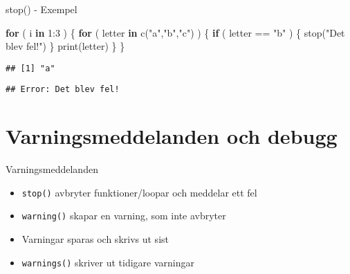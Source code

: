 \documentclass[
  11pt,
  ignorenonframetext,
]{beamer}
\newenvironment{Shaded}{\begin{snugshade}}{\end{snugshade}}
\newcommand{\ControlFlowTok}[1]{\textcolor[rgb]{0.13,0.29,0.53}{\textbf{#1}}}
\newcommand{\DecValTok}[1]{\textcolor[rgb]{0.00,0.00,0.81}{#1}}
\newcommand{\FunctionTok}[1]{\textcolor[rgb]{0.00,0.00,0.00}{#1}}
\newcommand{\NormalTok}[1]{#1}
\newcommand{\SpecialCharTok}[1]{\textcolor[rgb]{0.00,0.00,0.00}{#1}}
\newcommand{\StringTok}[1]{\textcolor[rgb]{0.31,0.60,0.02}{#1}}
\providecommand{\tightlist}{%
  \setlength{\itemsep}{0pt}\setlength{\parskip}{0pt}}
\begin{document}
\begin{frame}[fragile]{stop() - Exempel}
\protect\hypertarget{stop---exempel}{}
\begin{Shaded}
\begin{Highlighting}[]
\ControlFlowTok{for}\NormalTok{ ( i }\ControlFlowTok{in} \DecValTok{1}\SpecialCharTok{:}\DecValTok{3}\NormalTok{ ) \{}
  \ControlFlowTok{for}\NormalTok{ ( letter }\ControlFlowTok{in} \FunctionTok{c}\NormalTok{(}\StringTok{"a"}\NormalTok{,}\StringTok{"b"}\NormalTok{,}\StringTok{"c"}\NormalTok{) ) \{}
    \ControlFlowTok{if}\NormalTok{ ( letter }\SpecialCharTok{==} \StringTok{"b"}\NormalTok{ ) \{ }\FunctionTok{stop}\NormalTok{(}\StringTok{"Det blev fel!"}\NormalTok{) \}}
    \FunctionTok{print}\NormalTok{(letter)}
\NormalTok{  \}}
\NormalTok{\}}
\end{Highlighting}
\end{Shaded}

\pause

\begin{verbatim}
## [1] "a"
\end{verbatim}

\begin{verbatim}
## Error: Det blev fel!
\end{verbatim}
\end{frame}

\hypertarget{varningsmeddelanden-och-debugg}{%
\section{Varningsmeddelanden och
debugg}\label{varningsmeddelanden-och-debugg}}


\begin{frame}{Varningsmeddelanden}
\protect\hypertarget{varningsmeddelanden}{}
\begin{itemize}
\tightlist
\item
  \texttt{stop()} avbryter funktioner/loopar och meddelar ett fel
\item
  \texttt{warning()} skapar en varning, som inte avbryter
\item
  Varningar sparas och skrivs ut sist
\item
  \texttt{warnings()} skriver ut tidigare varningar
\end{itemize}
\end{frame}

\end{document}
